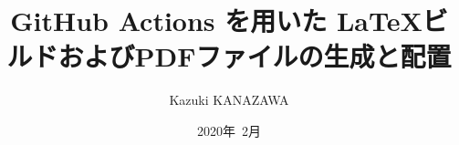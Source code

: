 \documentclass[fleqn,11pt]{jarticle}
\begin{document}
\title{GitHub Actions を用いた \LaTeX ビルドおよびPDFファイルの生成と配置}

\vspace{5cm}
\author{\Large Kazuki KANAZAWA}
\date{2020年~2月}

\maketitle



\end{document}
